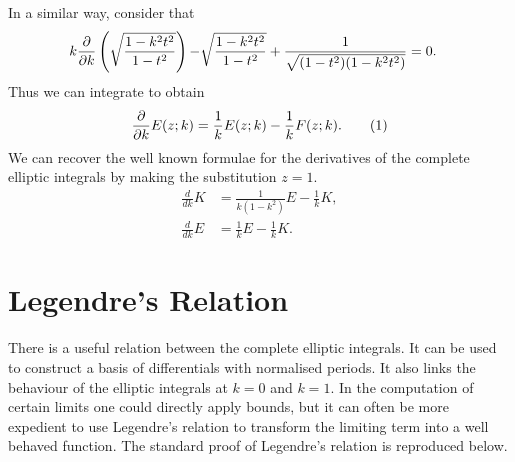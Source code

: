 In a similar way, consider that
\begin{align*}
k\frac{\partial }{\partial k}\left(\sqrt{\frac{1-k^2t^2}{1-t^2}}\right) -& \sqrt{\frac{1-k^2t^2}{1-t^2}} + \frac{1}{\sqrt{(1-t^2)(1-k^2 t^2)}}
= 0.
\end{align*}
Thus we can integrate to obtain
\[
\Partial{}{k}E(z;k) = \frac{1}{k}E(z;k) - \frac{1}{k}F(z;k). \labelthis{eqn:dtildeEdk}
\]
We can recover the well known formulae for the derivatives of the complete elliptic integrals by making the substitution $z=1$.
\begin{align}
\frac{d}{dk}K &= \frac{1}{k(1-k^2)}E - \frac{1}{k}K, \label{eqn:dKdk}\\
\frac{d}{dk}E &= \frac{1}{k}E - \frac{1}{k} K. \label{eqn:dEdk}
\end{align}














\section{Legendre's Relation}
\label{sec:Legendre's Relation}
There is a useful relation between the complete elliptic integrals. It can be used to construct a basis of differentials with normalised periods. It also links the behaviour of the elliptic integrals at $k=0$ and $k=1$. In the computation of certain limits one could directly apply bounds, but it can often be more expedient to use Legendre's relation to transform the limiting term into a well behaved function.
The standard proof of Legendre's relation is reproduced below.

